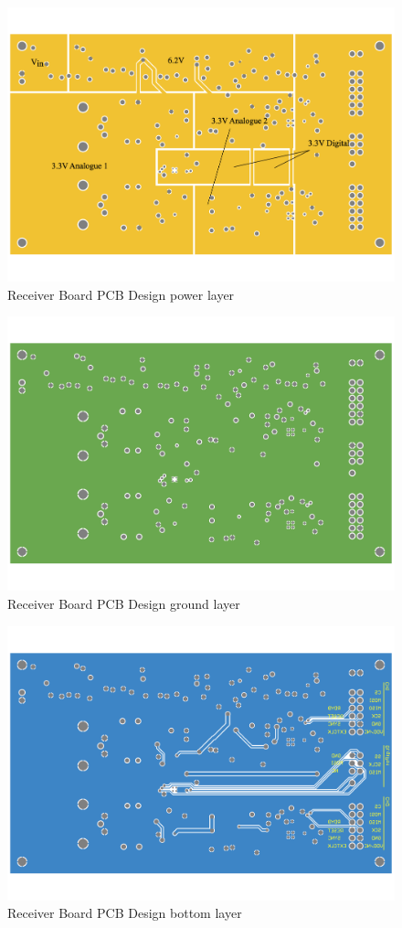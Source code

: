 \begin{figure}[H]
\centering
\includegraphics[width=0.9\linewidth]{4-ANC_Sys/PCB_2.pdf}
\caption{Receiver Board PCB Design power layer}
\label{fig_PCB_2}
\end{figure}

\begin{figure}[H]
\centering
\includegraphics[width=0.9\linewidth]{4-ANC_Sys/PCB_3.pdf}
\caption{Receiver Board PCB Design ground layer}
\label{fig_PCB_3}
\end{figure}

\begin{figure}[H]
\centering
\includegraphics[width=0.9\linewidth]{4-ANC_Sys/PCB_4.pdf}
\caption{Receiver Board PCB Design bottom layer}
\label{fig_PCB_4}
\end{figure}


